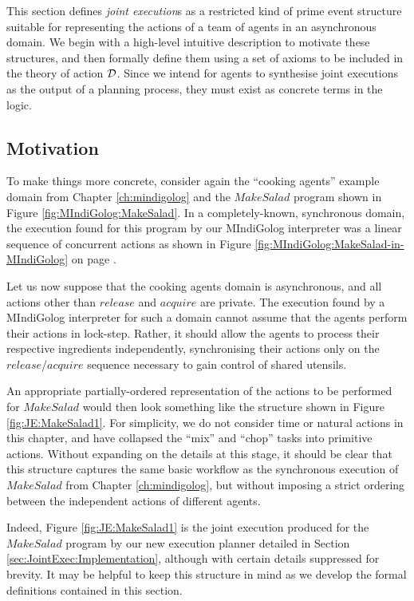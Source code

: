 This section defines \emph{joint execution}s as a restricted kind
of prime event structure suitable for representing the actions of
a team of agents in an asynchronous domain. We begin with a high-level
intuitive description to motivate these structures, and then formally
define them using a set of axioms to be included in the theory of
action $\mathcal{D}$. Since we intend for agents to synthesise joint executions
as the output of a planning process, they must exist as concrete terms
in the logic.


\subsection{Motivation}

To make things more concrete, consider again the {}``cooking agents''
example domain from Chapter \ref{ch:mindigolog} and the $MakeSalad$
program shown in Figure \ref{fig:MIndiGolog:MakeSalad}. In a completely-known,
synchronous domain, the execution found for this program by our MIndiGolog
interpreter was a linear sequence of concurrent actions as shown in
Figure \ref{fig:MIndiGolog:MakeSalad-in-MIndiGolog} on page \pageref{fig:MIndiGolog:MakeSalad-in-MIndiGolog}.

Let us now suppose that the cooking agents domain is asynchronous,
and all actions other than $release$ and $acquire$ are private.
The execution found by a MIndiGolog interpreter for such a domain
cannot assume that the agents perform their actions in lock-step.
Rather, it should allow the agents to process their respective ingredients
independently, synchronising their actions only on the $release$/$acquire$
sequence necessary to gain control of shared utensils.

An appropriate partially-ordered representation of the actions to
be performed for $MakeSalad$ would then look something like the structure
shown in Figure \ref{fig:JE:MakeSalad1}. For simplicity, we do not
consider time or natural actions in this chapter, and have collapsed
the {}``mix'' and {}``chop'' tasks into primitive actions. Without
expanding on the details at this stage, it should be clear that this
structure captures the same basic workflow as the synchronous execution
of $MakeSalad$ from Chapter \ref{ch:mindigolog}, but without imposing
a strict ordering between the independent actions of different agents.

Indeed, Figure \ref{fig:JE:MakeSalad1} is the joint execution produced
for the $MakeSalad$ program by our new execution planner detailed
in Section \ref{sec:JointExec:Implementation}, although with certain
details suppressed for brevity. It may be helpful to keep this structure
in mind as we develop the formal definitions contained in this section.

